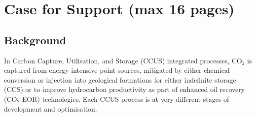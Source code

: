 \documentclass[12pts,a4paper,amsmath,amssymb,floatfix]{article}%
\newcommand{\CO}{CO\ensuremath{_{2}}}
\begin{document}
%
%


\clearpage

\section{Case for Support (max 16 pages)}

\subsection{Background}

In Carbon Capture, Utilisation, and Storage (CCUS) integrated processes, \CO\; is captured from energy-intensive point sources, mitigated by either chemical conversion or injection into geological formations for either indefinite storage (CCS) or to improve hydrocarbon productivity as part of enhanced oil recovery (\CO-EOR) technologies. Each CCUS process is at very different stages of development and optimisation.
\end{document}
